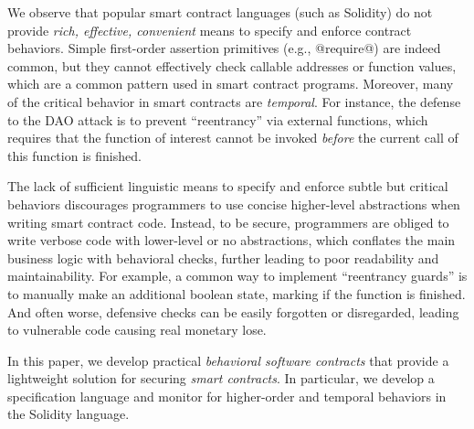

We observe that popular smart contract languages (such as Solidity) do
not provide \emph{rich, effective, convenient} means to specify and enforce
contract behaviors.
Simple first-order assertion primitives (e.g., @require@) are indeed common,
but they cannot effectively check callable addresses or function values, which
are a common pattern used in smart contract programs.
Moreover, many of the critical behavior in smart contracts are \emph{temporal}.
For instance, the defense to the DAO attack  is to
prevent ``reentrancy'' via external functions, which requires that the function
of interest cannot be invoked \emph{before} the current call of this function is finished.

The lack of sufficient linguistic means to specify and enforce subtle but
critical behaviors discourages programmers to use concise higher-level
abstractions when writing smart contract code.
Instead, to be secure, programmers are obliged to write verbose code with
lower-level or no abstractions, which conflates the main business logic with
behavioral checks, further leading to poor readability and maintainability.
For example, a common way to implement ``reentrancy guards'' is to manually
make an additional boolean state, marking if the function is finished.
And often worse, defensive checks can be easily forgotten or disregarded,
leading to vulnerable code causing real monetary lose.

In this paper, we develop practical \emph{behavioral
software contracts} that provide a lightweight solution for securing
\emph{smart contracts}. In particular, we develop a specification language and
monitor for higher-order and temporal behaviors in the Solidity language.

